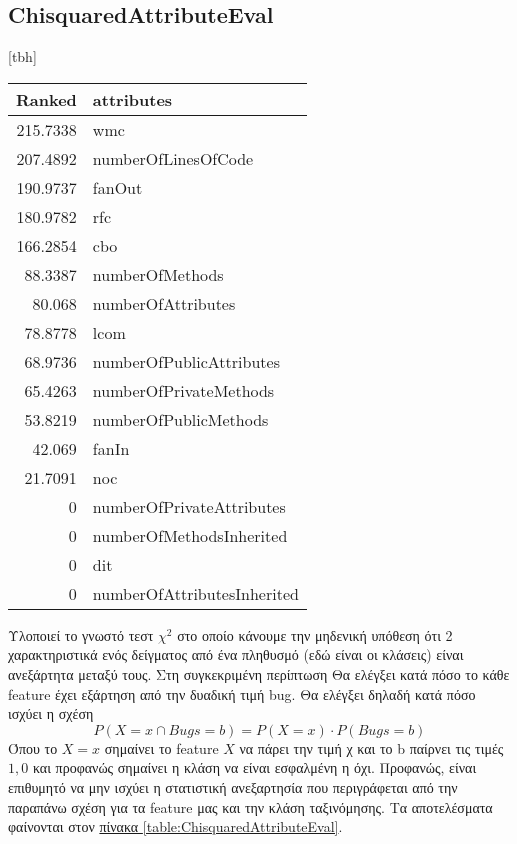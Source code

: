 \subsection{ChisquaredAttributeEval}
\begin{minipage}{1.0\textwidth}
\begin{center}[tbh]
\begin{tabular}{r|l}
Ranked& attributes\\
\hline
215.7338 &  wmc\\
207.4892 &   numberOfLinesOfCode\\
190.9737 &   fanOut\\
180.9782 &  rfc\\
166.2854 &   cbo\\
88.3387 &  numberOfMethods\\
80.068  &   numberOfAttributes\\
78.8778&   lcom\\
68.9736&   numberOfPublicAttributes\\
65.4263&   numberOfPrivateMethods\\
53.8219&   numberOfPublicMethods\\
42.069  &   fanIn\\
21.7091&    noc\\
0      &  numberOfPrivateAttributes\\
0     &   numberOfMethodsInherited\\
0    &     dit\\
0    &     numberOfAttributesInherited\\
\end{tabular}
\label{table:ChisquaredAttributeEval}
\end{center}
Υλοποιεί το γνωστό τεστ $\chi^2 $ στο οποίο κάνουμε την μηδενική υπόθεση ότι 2 χαρακτηριστικά ενός δείγματος από ένα πληθυσμό (εδώ είναι οι κλάσεις) είναι ανεξάρτητα μεταξύ τους.
Στη συγκεκριμένη περίπτωση Θα ελέγξει κατά πόσο το κάθε feature έχει εξάρτηση από την δυαδική τιμή bug.
Θα ελέγξει δηλαδή  κατά πόσο ισχύει η σχέση
\[ P(X=x \cap Bugs = b) = P(X=x) \cdot P(Bugs =b) \]
Όπου το $X=x$ σημαίνει το feature $Χ$ να πάρει την τιμή χ και το b  παίρνει τις τιμές $1,0$ και προφανώς σημαίνει η κλάση να είναι εσφαλμένη η όχι.
Προφανώς, είναι επιθυμητό να μην ισχύει η στατιστική ανεξαρτησία που περιγράφεται από την παραπάνω σχέση για τα feature μας και την κλάση ταξινόμησης.
Τα αποτελέσματα φαίνονται στον
\hyperref[table:ChisquaredAttributeEval]{πίνακα \ref{table:ChisquaredAttributeEval}}.
\end{minipage}

